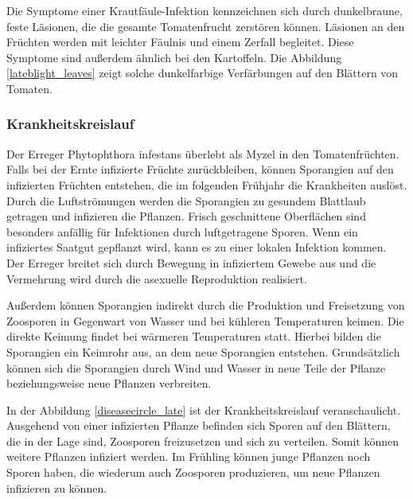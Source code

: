 Die Symptome einer Krautfäule-Infektion kennzeichnen sich durch dunkelbraune, feste Läsionen, die die gesamte Tomatenfrucht zerstören können. Läsionen an den Früchten werden mit leichter Fäulnis und einem Zerfall begleitet. Diese Symptome sind außerdem ähnlich bei den Kartoffeln. Die Abbildung \ref{lateblight_leaves} zeigt solche dunkelfarbige Verfärbungen auf den Blättern von Tomaten. 


\subsubsection{Krankheitskreislauf}

Der Erreger Phytophthora infestans überlebt als Myzel in den Tomatenfrüchten. Falls bei der Ernte infizierte Früchte zurückbleiben, können Sporangien auf den infizierten Früchten entstehen, die im folgenden Frühjahr die Krankheiten auslöst. Durch die Luftströmungen werden die Sporangien zu gesundem Blattlaub getragen und infizieren die Pflanzen. Frisch geschnittene Oberflächen sind besonders anfällig für Infektionen durch luftgetragene Sporen. Wenn ein infiziertes Saatgut gepflanzt wird, kann es zu einer lokalen Infektion kommen. Der Erreger breitet sich durch Bewegung in infiziertem Gewebe aus und die Vermehrung wird durch die asexuelle Reproduktion realisiert.

Außerdem können Sporangien indirekt durch die Produktion und Freisetzung von Zoosporen in Gegenwart von Wasser und bei kühleren Temperaturen keimen. Die direkte Keimung findet bei wärmeren Temperaturen statt. Hierbei bilden die Sporangien ein Keimrohr aus, an dem neue Sporangien entstehen. Grundsätzlich können sich die Sporangien durch Wind und Wasser in neue Teile der Pflanze beziehungsweise neue Pflanzen verbreiten\cite{lbopat}.%

In der Abbildung \ref{diseasecircle_late} ist der Krankheitskreislauf veranschaulicht. Ausgehend von einer infizierten Pflanze befinden sich Sporen auf den Blättern, die in der Lage sind, Zoosporen freizusetzen und sich zu verteilen. Somit können weitere Pflanzen infiziert werden. Im Frühling können junge Pflanzen noch Sporen haben, die wiederum auch Zoosporen produzieren, um neue Pflanzen infizieren zu können.

